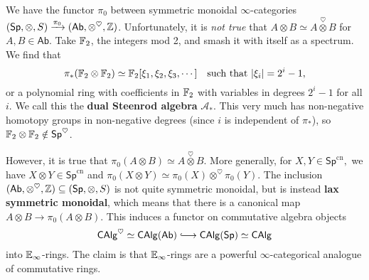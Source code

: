 \begin{example}
    We have the functor $\pi_0$ between symmetric monoidal $\infty$-categories $(\mathsf{Sp} ,\otimes, S) \xrightarrow{\pi_0} (\mathsf{Ab} ,\otimes ^{\heartsuit}, \mathbb{Z})$. Unfortunately, it is \emph{not true}  that $A\otimes B \simeq  A \overset{\heartsuit}{\otimes} B$ for $A,B \in \mathsf{Ab} $. Take $\mathbb{F}_2$, the integers mod 2, and smash it with itself as a spectrum. We find that \[
        \pi_*(\mathbb{F}_2 \otimes \mathbb{F}_2) \simeq  \mathbb{F}_2[\xi_1,\xi_2,\xi_3,\cdots ] \quad \text{such that} \ |\xi_i |=2^i -1,
    \] or a polynomial ring with coefficients in $\mathbb{F}_2$ with variables in degrees $2^i -1$ for all $i$. We call this the \textbf{dual Steenrod algebra} $\mathscr{A} _*$. This very much has non-negative homotopy groups in non-negative degrees (since $i$ is independent of $\pi_*$), so $\mathbb{F}_2\otimes \mathbb{F}_2 \notin \mathsf{Sp} ^{\heartsuit} $.
\end{example}
However, it is true that $\pi_0(A\otimes B) \simeq  A \overset{\heartsuit}{\otimes} B$. More generally, for $X,Y \in \mathsf{Sp} ^{\mathrm{cn}},$ we have $X \otimes Y \in \mathsf{Sp} ^{\mathrm{cn}}$ and $\pi_0(X \otimes Y) \simeq  \pi_0(X) \otimes ^{\heartsuit} \pi_0(Y)$. The inclusion $(\mathsf{Ab} ,\otimes ^{\heartsuit}, \mathbb{Z}) \subseteq (\mathsf{Sp} ,\otimes, S)$ is not quite symmetric monoidal, but is instead \textbf{lax symmetric monoidal}, which means that there is a canonical map  $A\otimes B \to  \pi_0(A\otimes B)$. This induces a functor on commutative algebra objects \[
    \mathsf{CAlg} ^{\heartsuit} \simeq  \mathsf{CAlg} (\mathsf{Ab} ) \lhook\joinrel\longrightarrow \mathsf{CAlg} (\mathsf{Sp} ) \simeq \mathsf{CAlg}
\] into $\mathbb{E}_{\infty}$-rings. The claim is that $\mathbb{E}_{\infty}$-rings are a powerful $\infty$-categorical analogue of commutative rings.

